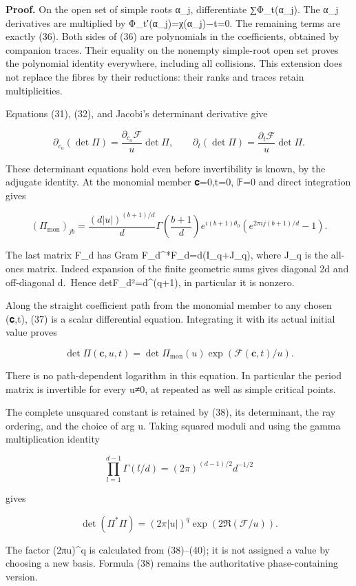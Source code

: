 \textbf{Proof.} On the open set of simple roots α\_j, differentiate ∑Φ\_t(α\_j). The α\_j derivatives are multiplied by Φ\_t′(α\_j)=χ(α\_j)−t=0. The remaining terms are exactly (36). Both sides of (36) are polynomials in the coefficients, obtained by companion traces. Their equality on the nonempty simple-root open set proves the polynomial identity everywhere, including all collisions. This extension does not replace the fibres by their reductions: their ranks and traces retain multiplicities.

Equations (31), (32), and Jacobi's determinant derivative give

\[
\partial_{c_a}(\det\Pi)
 =\frac{\partial_{c_a}\mathcal F}u\det\Pi,
\qquad
\partial_t(\det\Pi)
 =\frac{\partial_t\mathcal F}u\det\Pi.
\tag{37}
\]

These determinant equations hold even before invertibility is known, by the adjugate identity. At the monomial member 𝐜=0,t=0, 𝔽=0 and direct integration gives

\[
(\Pi_{\mathrm{mon}})_{jb}
 =\frac{(d|u|)^{(b+1)/d}}d
 \Gamma\!\left(\frac{b+1}d\right)
 e^{i(b+1)\theta_0}
 (e^{2\pi i j(b+1)/d}-1).
\tag{38}
\]

The last matrix F\_d has Gram F\_d\^{}*F\_d=d(I\_q+J\_q), where J\_q is the all-ones matrix. Indeed expansion of the finite geometric sums gives diagonal 2d and off-diagonal d.~Hence \textbar detF\_d\textbar²=d\^{}(q+1), in particular it is nonzero.

Along the straight coefficient path from the monomial member to any chosen (𝐜,t), (37) is a scalar differential equation. Integrating it with its actual initial value proves

\[
\boxed{
\det\Pi(\mathbf c,u,t)
 =\det\Pi_{\mathrm{mon}}(u)\exp(\mathcal F(\mathbf c,t)/u).
}
\tag{39}
\]

There is no path-dependent logarithm in this equation. In particular the period matrix is invertible for every u≠0, at repeated as well as simple critical points.

The complete unsquared constant is retained by (38), its determinant, the ray ordering, and the choice of arg u. Taking squared moduli and using the gamma multiplication identity

\[
\prod_{l=1}^{d-1}\Gamma(l/d)=(2\pi)^{(d-1)/2}d^{-1/2}
\tag{40}
\]

gives

\[
\boxed{\det(\Pi^*\Pi)
 =(2\pi|u|)^q\exp(2\Re(\mathcal F/u)).}
\tag{41}
\]

The factor (2π\textbar u\textbar)\^{}q is calculated from (38)--(40); it is not assigned a value by choosing a new basis. Formula (38) remains the authoritative phase-containing version.

